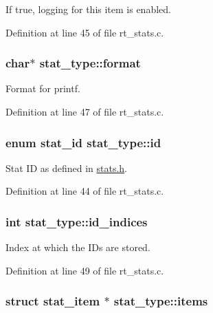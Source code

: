 If true, logging for this item is enabled. 



Definition at line 45 of file rt\-\_\-stats.\-c.

\hypertarget{structstat__type_afb56fba8ca558f25ae9e89192430381e}{
\subsubsection[{format}]{\setlength{\rightskip}{0pt plus 5cm}char$\ast$ stat\-\_\-type\-::format}}\label{structstat__type_afb56fba8ca558f25ae9e89192430381e}


Format for printf. 



Definition at line 47 of file rt\-\_\-stats.\-c.

\hypertarget{structstat__type_a6ad1dba35c226756f00d7d14f4615d8a}{
\subsubsection[{id}]{\setlength{\rightskip}{0pt plus 5cm}enum {\bf stat\-\_\-id} stat\-\_\-type\-::id}}\label{structstat__type_a6ad1dba35c226756f00d7d14f4615d8a}


Stat I\-D as defined in \hyperlink{stats_8h}{stats.\-h}. 



Definition at line 44 of file rt\-\_\-stats.\-c.

\hypertarget{structstat__type_a8960781cdec87c113b60ddf11dd4fab2}{
\subsubsection[{id\-\_\-indices}]{\setlength{\rightskip}{0pt plus 5cm}int stat\-\_\-type\-::id\-\_\-indices}}\label{structstat__type_a8960781cdec87c113b60ddf11dd4fab2}


Index at which the I\-Ds are stored. 



Definition at line 49 of file rt\-\_\-stats.\-c.

\hypertarget{structstat__type_a15ccf932c19f6e6b07a3575a956cfacd}{
\subsubsection[{items}]{\setlength{\rightskip}{0pt plus 5cm}struct {\bf stat\-\_\-item} $\ast$ stat\-\_\-type\-::items}}\label{structstat__type_a15ccf932c19f6e6b07a3575a956cfacd}


